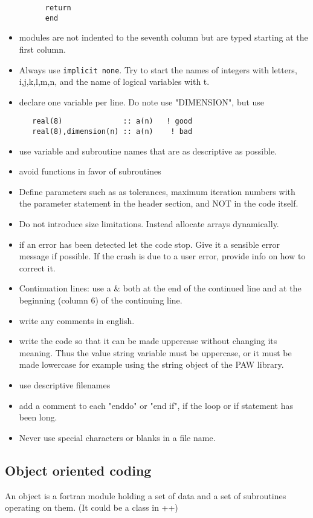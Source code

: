 \documentclass[11pt,a4paper]{report}
\begin{document}
\begin{itemize}
\begin{verbatim}
      return
      end
\end{verbatim}
%
\item modules are not indented to the seventh column but are typed
 starting at the first column.
%
\item Always use \verb|implicit none|. Try to start the names of integers with
 letters, i,j,k,l,m,n, and the name of logical variables with t.
%
\item declare one variable per line. Do note use "DIMENSION", but use
\begin{verbatim}
   real(8)              :: a(n)   ! good
   real(8),dimension(n) :: a(n)    ! bad
\end{verbatim}
%
\item use variable and subroutine names that are as descriptive as
 possible.
%
\item avoid functions in favor of subroutines
%
\item Define parameters such as as tolerances, maximum iteration
 numbers with the parameter statement in the header section, and NOT
 in the code itself.
%
\item Do not introduce size limitations. Instead allocate arrays
 dynamically.
%
\item if an error has been detected let the code stop. Give it a
 sensible error message if possible. If the crash is due to a user
 error, provide info on how to correct it.
%
\item Continuation lines: use a \& both at the end of the continued
 line and at the beginning (column 6) of the continuing line.
%
\item write any comments in english.
%
\item write the code so that it can be made uppercase without changing
 its meaning. Thus the value string variable must be uppercase, or it
 must be made lowercase for example using the string object of the PAW
 library.
%
\item use descriptive filenames
%
\item add a comment to each "enddo" or "end if", if the loop or if
 statement has been long.
%
\item Never use special characters or blanks in a file name.
\end{itemize}

\subsection{Object oriented coding}
An object is a fortran module holding a set of data and a set of
 subroutines operating on them. (It could be a class in ++)
\end{document}
